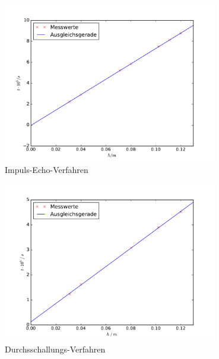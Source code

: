 \begin{figure}
  \centering
  \includegraphics[height= 7cm]{plots/IE_plot.pdf}
  \caption{Impuls-Echo-Verfahren}
  \label{fig:IEplot}
\end{figure}
\begin{figure}
  \centering
  \includegraphics[height = 7cm]{plots/DS_plot.pdf}
  \caption{Durchsschallungs-Verfahren}
  \label{fig:DSplot}
\end{figure}
